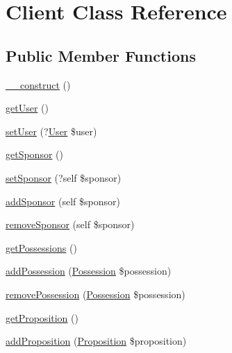 \hypertarget{class_app_1_1_entity_1_1_client}{}\section{Client Class Reference}
\label{class_app_1_1_entity_1_1_client}
\subsection*{Public Member Functions}
\begin{DoxyCompactItemize}
\item 
\mbox{\hyperlink{class_app_1_1_entity_1_1_client_a095c5d389db211932136b53f25f39685}{\+\_\+\+\_\+construct}} ()
\item 
\mbox{\hyperlink{class_app_1_1_entity_1_1_client_ae81b7186fb97a7c6457edcc68c9aa2ef}{get\+User}} ()
\item 
\mbox{\hyperlink{class_app_1_1_entity_1_1_client_a406a111868b45aad6d4c8ab5b0c5bcb9}{set\+User}} (?\mbox{\hyperlink{class_app_1_1_entity_1_1_user}{User}} \$user)
\item 
\mbox{\hyperlink{class_app_1_1_entity_1_1_client_a9ac0596c959dd68bde964b499a75cb8c}{get\+Sponsor}} ()
\item 
\mbox{\hyperlink{class_app_1_1_entity_1_1_client_a510c1a579947444e358b948d2c5dc250}{set\+Sponsor}} (?self \$sponsor)
\item 
\mbox{\hyperlink{class_app_1_1_entity_1_1_client_a1f696555faa7189d600a8d4e8cba8115}{add\+Sponsor}} (self \$sponsor)
\item 
\mbox{\hyperlink{class_app_1_1_entity_1_1_client_abb49e2b69700646fa7820517d90a957b}{remove\+Sponsor}} (self \$sponsor)
\item 
\mbox{\hyperlink{class_app_1_1_entity_1_1_client_ac4cac51c734a24a84655cd6294ff4afb}{get\+Possessions}} ()
\item 
\mbox{\hyperlink{class_app_1_1_entity_1_1_client_a5188d786a9c3e2f2936d783276947acc}{add\+Possession}} (\mbox{\hyperlink{class_app_1_1_entity_1_1_possession}{Possession}} \$possession)
\item 
\mbox{\hyperlink{class_app_1_1_entity_1_1_client_a720a2c7cb1ff271659d4ca746e29ca47}{remove\+Possession}} (\mbox{\hyperlink{class_app_1_1_entity_1_1_possession}{Possession}} \$possession)
\item 
\mbox{\hyperlink{class_app_1_1_entity_1_1_client_aa37187d64f069bb4138a898dc861dcc9}{get\+Proposition}} ()
\item 
\mbox{\hyperlink{class_app_1_1_entity_1_1_client_a0fb37c482d114bb0ddea86771b806277}{add\+Proposition}} (\mbox{\hyperlink{class_app_1_1_entity_1_1_proposition}{Proposition}} \$proposition)

\end{DoxyCompactItemize}
